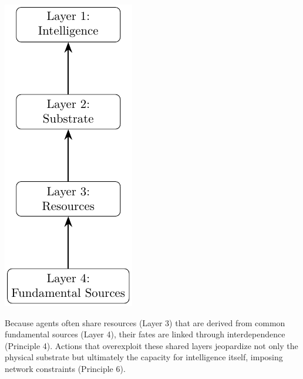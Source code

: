 \begin{center}
\includegraphics{docs/figures/layers} 
\end{center}

Because agents often share resources (Layer 3) that are derived from common fundamental sources (Layer 4), their fates are linked through interdependence (Principle 4). Actions that overexploit these shared layers jeopardize not only the physical substrate but ultimately the capacity for intelligence itself, imposing network constraints (Principle 6). %

